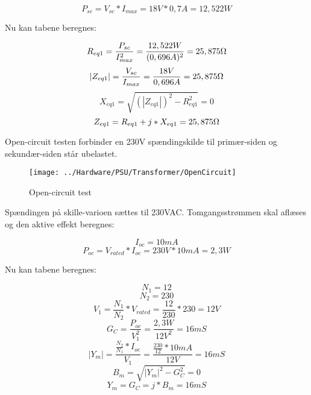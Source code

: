 \begin{equation}
	P_{sc} = V_{sc} * I_{max} = 18V * 0,7A = 12,522W
\end{equation}


Nu kan tabene beregnes:

\begin{equation}
	R_{eq1} = \frac{P_{sc}}{I_{max}^2} = \frac{12,522W}{(0,696A)^2} = 25,875\ohm
\end{equation}
\begin{equation}
	\left|Z_{eq1}\right| = \frac{V_{sc}}{I_{max}} = \frac{18V}{0,696A} = 25,875\ohm
\end{equation}
\begin{equation}
	X_{eq1} = \sqrt{\left(\left|Z_{eq1}\right|\right)^2 - R_{eq1}^2} = 0
\end{equation}
\begin{equation}
	Z_{eq1} = R_{eq1} + j * X_{eq1} = 25,875\ohm
\end{equation}


Open-circuit testen forbinder en 230V spændingskilde til primær-siden og sekundær-siden står ubelastet.

\begin{figure}[H]
	\centering
	\texttt{[image: ../Hardware/PSU/Transformer/OpenCircuit]}
	\caption{Open-circuit test}
	\label{photo:OpenCircuit}
\end{figure}


Spændingen på skille-varioen sættes til 230VAC. Tomgangsstrømmen skal aflæses og den aktive effekt beregnes:

\begin{equation}
	I_{oc} = 10mA
\end{equation}
\begin{equation}
	P_{oc} = V_{rated} * I_{oc} = 230V * 10mA = 2,3W
\end{equation}


Nu kan tabene beregnes:

\begin{equation}
	N_1 = 12
\end{equation}
\begin{equation}
	N_2 = 230
\end{equation}
\begin{equation}
	V_1 = \frac{N_1}{N_2} * V_{rated} = \frac{12}{230} * 230 = 12V
\end{equation}
\begin{equation}
	G_C = \frac{P_{oc}}{V_1^2} = \frac{2,3W}{12V^2} = 16mS
\end{equation}
\begin{equation}
	\left|Y_m\right| = \frac{\frac{N_2}{N_1} * I_{oc}}{V_1} = \frac{\frac{230}{12} * 10mA}{12V} = 16mS
\end{equation}
\begin{equation}
	B_m = \sqrt{\left|Y_m\right|^2 - G_C^2} = 0
\end{equation}
\begin{equation}
	Y_m = G_C = j * B_m = 16mS
\end{equation}


